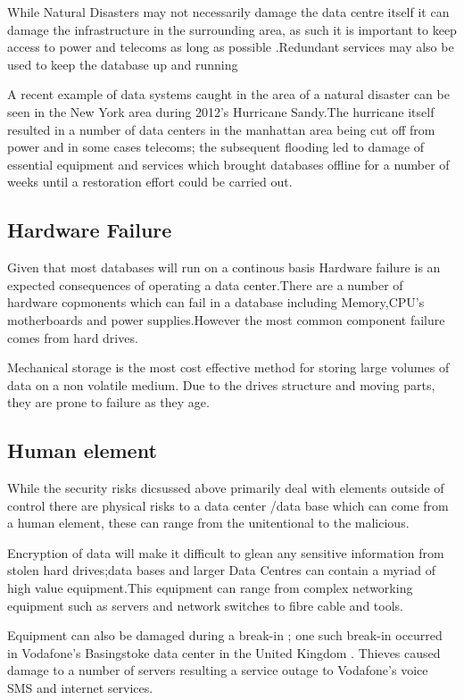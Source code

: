 \documentclass[11pt, twocolumn]{article}
\begin{document}
While Natural Disasters may not necessarily damage the data centre itself it can damage the infrastructure in the surrounding area, as such it is important to keep access to power and telecoms as long as possible .Redundant services may also be used to keep the database up and running  

A recent example of data systems caught in the area of a natural disaster can be seen in the New York area during 2012's Hurricane Sandy.The hurricane itself resulted in a number of data centers in the manhattan area being cut off from power and in some cases telecoms; the subsequent flooding led to damage of essential equipment and services which brought databases offline for a number of weeks until a restoration effort could be carried out.\cite{sean4}


\subsection{Hardware Failure}
Given that most databases will run on a continous basis Hardware failure is an expected consequences of operating a data center.There are a number of hardware copmonents which can fail in a database including Memory,CPU's motherboards and power supplies\cite{sean9}.However the most common component failure comes from hard drives.

Mechanical storage is the most cost effective method for storing large volumes of data on a non volatile medium\cite{sean2}. Due to the drives structure and moving parts, they are prone to failure as they age.

\subsection{Human element}
While the security risks dicsussed above primarily deal with elements outside of control there are physical risks to a data center /data base which can come from a human element, these can range from the unitentional to the malicious.

Encryption of data will make it  difficult to glean any sensitive information from stolen hard drives;data bases and larger Data Centres can contain a myriad of high value equipment.This equipment can range from complex networking equipment such as servers and network switches to fibre cable and tools.

Equipment can also be damaged during a break-in ; one such break-in occurred in Vodafone’s Basingstoke data center in the United Kingdom \cite{sean8}. Thieves caused damage to a number of servers resulting a service outage to Vodafone's voice SMS and internet services.
\end{document}
